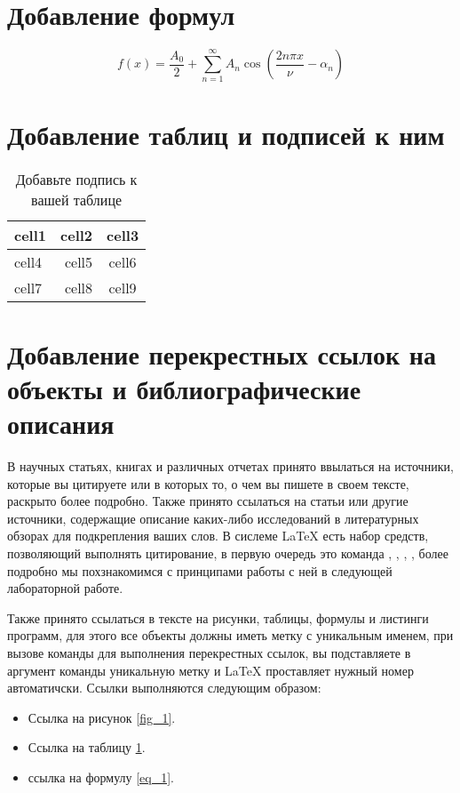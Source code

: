 \documentclass{article} %
\begin{document}
\section{Добавление формул}

\begin{equation}\label{eq_1} %
  f(x) = \frac{A_0}{2} + \sum \limits_{n=1}^{\infty} A_n \cos \left(
  \frac{2 n \pi x}{\nu} - \alpha_n \right)
\end{equation}

\section{Добавление таблиц и подписей к ним}

\begin{table}[!h] %
  \centering %
  \caption{Добавьте подпись к вашей таблице} \label{tab_1} %
  \begin{tabular}{ |l|r|c| } %
    \hline
    cell1 & cell2 & cell3 \\
    \hline
    cell4 & cell5 & cell6 \\
    \hline
    cell7 & cell8 & cell9 \\
    \hline
  \end{tabular}
\end{table}

\section{Добавление перекрестных ссылок на объекты и библиографические описания}

В научных статьях, книгах и различных отчетах принято ввылаться на
источники, которые вы цитируете или в которых то, о чем вы пишете в
своем тексте, раскрыто более подробно. Также принято ссылаться на
статьи или другие источники, содержащие описание каких-либо
исследований в литературных обзорах для подкрепления ваших слов. В
сислеме \LaTeX{} есть набор средств, позволяющий выполнять
цитирование, в первую очередь это команда \cite{Harrison_Cosmology},
\cite{Michie2009}, \cite{Barchi_2020}, \cite{Lee2016}, более подробно
мы похзнакомимся с принципами работы с ней в следующей лабораторной работе.

Также принято ссылаться в тексте на рисунки, таблицы, формулы и
листинги программ, для этого все объекты должны иметь метку с
уникальным именем, при вызове команды для выполнения перекрестных
ссылок, вы подставляете в аргумент команды уникальную метку и
\LaTeX{} проставляет нужный номер автоматичски. Ссылки выполняются
следующим образом:
\begin{itemize}
  \item Ссылка на рисунок \ref{fig_1}.
  \item Ссылка на таблицу \ref{tab_1}.
  \item ссылка на формулу \eqref{eq_1}.
\end{itemize}
\end{document}
